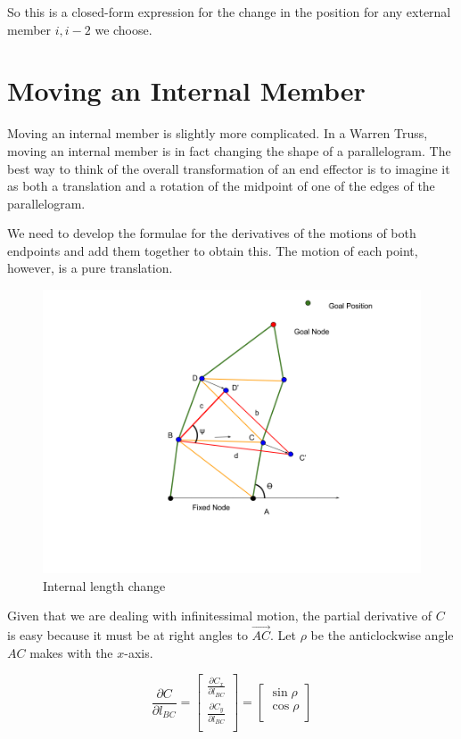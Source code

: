 \documentclass[11pt]{article}
\begin{document}
So this is a closed-form expression for the change in the position for any external member $i,i-2$ we choose.

\section{Moving an Internal Member}

Moving an internal member is slightly more complicated. In a Warren Truss, moving an internal member is in fact
changing the shape of a parallelogram.  The best way to think of the overall transformation of an end effector is
to imagine it as both a translation and a rotation of the midpoint of one of the edges of the parallelogram.

We need to develop the formulae for the derivatives of the motions of both endpoints and add them together to obtain this.
The motion of each point, however, is a pure translation.

\begin{figure}
  \centering
  \includegraphics[width=\textwidth]{Internal angle change.png}
  \caption{Internal length change}  
\end{figure}

Given that we are dealing with infinitessimal motion, the partial derivative of $C$ is easy
because it must be at right angles to $\vec{AC}$. Let $\rho$ be the anticlockwise angle $AC$ makes with the $x$-axis.

\[
\frac{\partial C}{\partial  l_{BC}} = \begin{bmatrix}
           \frac{\partial C_x}{\partial l_{BC}} \\
           \frac{\partial C_y}{\partial l_{BC}} \\
         \end{bmatrix} = \begin{bmatrix}
           \sin{\rho}  \\
           \cos{\rho} \\
         \end{bmatrix}
\]
\end{document}
